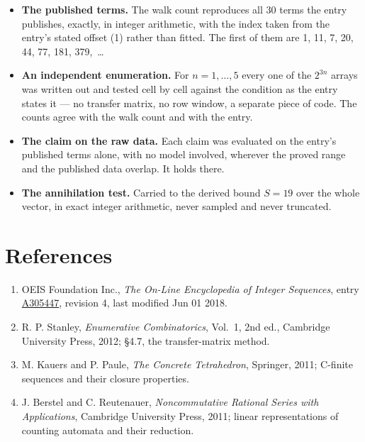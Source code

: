 \documentclass[11pt]{article}
\theoremstyle{definition}
\begin{document}
\begin{itemize}

\item {\bfseries The published terms.} The walk count reproduces all 30 terms the entry publishes, exactly, in integer arithmetic, with the index taken from the entry's stated offset (1) rather than fitted. The first of them are 1, 11, 7, 20, 44, 77, 181, 379,~\dots

\item {\bfseries An independent enumeration.} For $n = 1,\dots,5$ every one of the $2^{3n}$ arrays was written out and tested cell by cell against the condition as the entry states it --- no transfer matrix, no row window, a separate piece of code. The counts agree with the walk count and with the entry.

\item {\bfseries The claim on the raw data.} Each claim was evaluated on the entry's published terms alone, with no model involved, wherever the proved range and the published data overlap. It holds there.

\item {\bfseries The annihilation test.} Carried to the derived bound $S = 19$ over the whole vector, in exact integer arithmetic, never sampled and never truncated.

\end{itemize}

\section{References}

\begin{enumerate}

\item OEIS Foundation Inc., \emph{The On-Line Encyclopedia of Integer Sequences}, entry \href{https://oeis.org/A305447}{A305447}, revision 4, last modified Jun 01 2018.

\item R. P. Stanley, \emph{Enumerative Combinatorics}, Vol.~1, 2nd ed., Cambridge University Press, 2012; \S4.7, the transfer-matrix method.

\item M. Kauers and P. Paule, \emph{The Concrete Tetrahedron}, Springer, 2011; C-finite sequences and their closure properties.

\item J. Berstel and C. Reutenauer, \emph{Noncommutative Rational Series with Applications}, Cambridge University Press, 2011; linear representations of counting automata and their reduction.

\end{enumerate}
\end{document}
